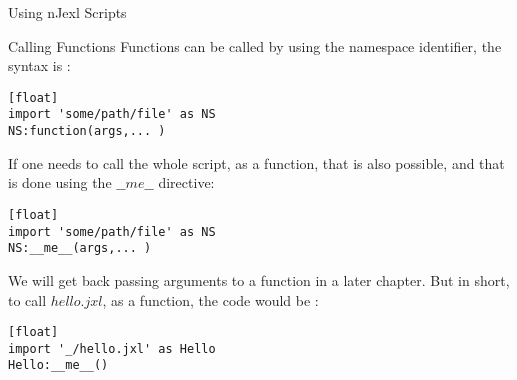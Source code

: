 \begin{section}{Using nJexl Scripts}
\begin{subsection}{Calling Functions}
Functions can be called by using the namespace identifier, the syntax is :

\begin{lstlisting}[style=JexlStyle][float]
import 'some/path/file' as NS
NS:function(args,... ) 
\end{lstlisting}

If one needs to call the whole script, as a function, 
that is also possible, and that is done using the $\_\_me\_\_$ directive:

\begin{lstlisting}[style=JexlStyle][float]
import 'some/path/file' as NS
NS:__me__(args,... ) 
\end{lstlisting}
We will get back passing arguments to a function in a later chapter.
But in short, to call $hello.jxl$, as a function, the code would be :

\begin{lstlisting}[style=JexlStyle][float]
import '_/hello.jxl' as Hello
Hello:__me__() 
\end{lstlisting}

\end{subsection}


\end{section}


